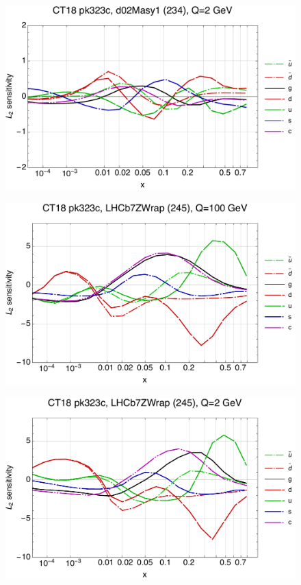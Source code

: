 \documentclass[10pt,aps,prd,floatfix,titlepage]{revtex4}
\begin{document}
\begin{figure}
\includegraphics[width=\textwidth,height=0.44\textheight,keepaspectratio]{1/234_ct18nn_L2_q2_Sf_1.pdf}
\caption{}
\end{figure}
\clearpage
\begin{figure}
\includegraphics[width=\textwidth,height=0.44\textheight,keepaspectratio]{1/245_ct18nn_L2_q100_Sf_1.pdf}
\caption{}
\end{figure}
\begin{figure}
\includegraphics[width=\textwidth,height=0.44\textheight,keepaspectratio]{1/245_ct18nn_L2_q2_Sf_1.pdf}
\caption{}
\end{figure}
\end{document}
